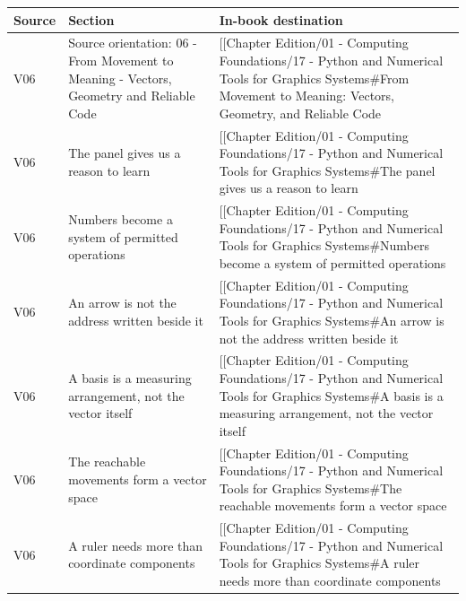 {\def\LTcaptype{none} %
\begin{longtable}[]{@{}
  >{\raggedright\arraybackslash}p{}
  >{\raggedright\arraybackslash}p{}
  >{\raggedright\arraybackslash}p{}@{}}
\toprule\noalign{}
\begin{minipage}[b]{\linewidth}\raggedright
Source
\end{minipage} & \begin{minipage}[b]{\linewidth}\raggedright
Section
\end{minipage} & \begin{minipage}[b]{\linewidth}\raggedright
In-book destination
\end{minipage} \\
\midrule\noalign{}
\endhead
\bottomrule\noalign{}
\endlastfoot
V06 & Source orientation: 06 - From Movement to Meaning - Vectors, Geometry and Reliable Code & {[}{[}Chapter Edition/01 - Computing Foundations/17 - Python and Numerical Tools for Graphics Systems\#From Movement to Meaning: Vectors, Geometry, and Reliable Code \\
V06 & The panel gives us a reason to learn & {[}{[}Chapter Edition/01 - Computing Foundations/17 - Python and Numerical Tools for Graphics Systems\#The panel gives us a reason to learn \\
V06 & Numbers become a system of permitted operations & {[}{[}Chapter Edition/01 - Computing Foundations/17 - Python and Numerical Tools for Graphics Systems\#Numbers become a system of permitted operations \\
V06 & An arrow is not the address written beside it & {[}{[}Chapter Edition/01 - Computing Foundations/17 - Python and Numerical Tools for Graphics Systems\#An arrow is not the address written beside it \\
V06 & A basis is a measuring arrangement, not the vector itself & {[}{[}Chapter Edition/01 - Computing Foundations/17 - Python and Numerical Tools for Graphics Systems\#A basis is a measuring arrangement, not the vector itself \\
V06 & The reachable movements form a vector space & {[}{[}Chapter Edition/01 - Computing Foundations/17 - Python and Numerical Tools for Graphics Systems\#The reachable movements form a vector space \\
V06 & A ruler needs more than coordinate components & {[}{[}Chapter Edition/01 - Computing Foundations/17 - Python and Numerical Tools for Graphics Systems\#A ruler needs more than coordinate components \\

\end{longtable}}
